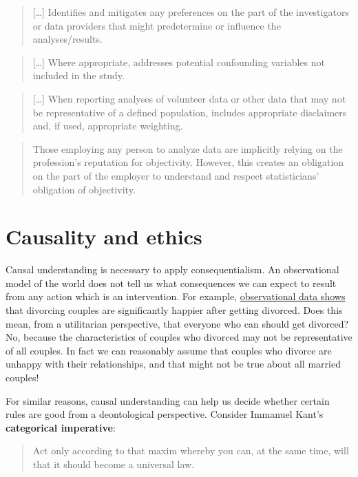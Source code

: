 \documentclass[]{book}
\theoremstyle{definition}
\theoremstyle{definition}
\theoremstyle{definition}
\theoremstyle{remark}
\begin{document}
\begin{quote}
{[}\ldots{}{]} Identifies and mitigates any preferences on the part of
the investigators or data providers that might predetermine or influence
the analyses/results.
\end{quote}

\begin{quote}
{[}\ldots{}{]} Where appropriate, addresses potential confounding
variables not included in the study.
\end{quote}

\begin{quote}
{[}\ldots{}{]} When reporting analyses of volunteer data or other data
that may not be representative of a defined population, includes
appropriate disclaimers and, if used, appropriate weighting.
\end{quote}

\begin{quote}
Those employing any person to analyze data are implicitly relying on the
profession's reputation for objectivity. However, this creates an
obligation on the part of the employer to understand and respect
statisticians' obligation of objectivity.
\end{quote}

\section{Causality and ethics}\label{causality-and-ethics}

Causal understanding is necessary to apply consequentialism. An
observational model of the world does not tell us what consequences we
can expect to result from any action which is an intervention. For
example,
\href{https://rss.onlinelibrary.wiley.com/doi/abs/10.1111/j.1467-985X.2006.00403.x}{observational
data shows} that divorcing couples are significantly happier after
getting divorced. Does this mean, from a utilitarian perspective, that
everyone who can should get divorced? No, because the characteristics of
couples who divorced may not be representative of all couples. In fact
we can reasonably assume that couples who divorce are unhappy with their
relationships, and that might not be true about all married couples!

For similar reasons, causal understanding can help us decide whether
certain rules are good from a deontological perspective. Consider
Immanuel Kant's \textbf{categorical imperative}:

\begin{quote}
Act only according to that maxim whereby you can, at the same time, will
that it should become a universal law.
\end{quote}
\end{document}
